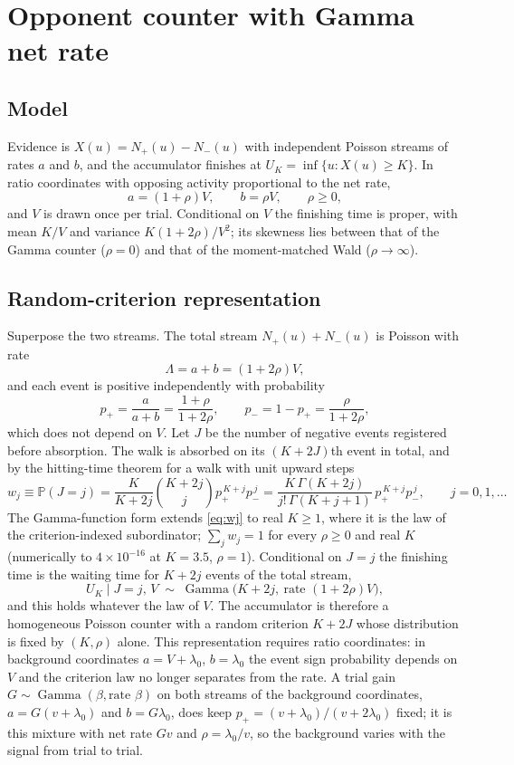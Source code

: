 \documentclass[11pt]{article}
\newcommand{\Gam}{\operatorname{Gamma}}
\newcommand{\Prob}{\mathbb{P}}
\begin{document}
\section{Opponent counter with Gamma net rate}

\subsection{Model}
Evidence is $X(u)=N_+(u)-N_-(u)$ with independent Poisson streams of rates $a$ and $b$, and the accumulator finishes at $U_K=\inf\{u: X(u)\ge K\}$. In ratio coordinates with opposing activity proportional to the net rate,
\[
a=(1+\rho)V,\qquad b=\rho V,\qquad \rho\ge0,
\]
and $V$ is drawn once per trial. Conditional on $V$ the finishing time is proper, with mean $K/V$ and variance $K(1+2\rho)/V^2$; its skewness lies between that of the Gamma counter ($\rho=0$) and that of the moment-matched Wald ($\rho\to\infty$).

\subsection{Random-criterion representation}
Superpose the two streams. The total stream $N_+(u)+N_-(u)$ is Poisson with rate
\[
\Lambda=a+b=(1+2\rho)V,
\]
and each event is positive independently with probability
\begin{equation}
p_+=\frac{a}{a+b}=\frac{1+\rho}{1+2\rho},\qquad p_-=1-p_+=\frac{\rho}{1+2\rho},
\label{eq:pplus}
\end{equation}
which does not depend on $V$. Let $J$ be the number of negative events registered before absorption. The walk is absorbed on its $(K+2J)$th event in total, and by the hitting-time theorem for a walk with unit upward steps
\begin{equation}
w_j\equiv\Prob(J=j)=\frac{K}{K+2j}\binom{K+2j}{j}p_+^{\,K+j}p_-^{\,j}
=\frac{K\,\Gamma(K+2j)}{j!\,\Gamma(K+j+1)}\,p_+^{\,K+j}p_-^{\,j},\qquad j=0,1,\dots
\label{eq:wj}
\end{equation}
The Gamma-function form extends \eqref{eq:wj} to real $K\ge1$, where it is the law of the criterion-indexed subordinator; $\sum_j w_j=1$ for every $\rho\ge0$ and real $K$ (numerically to $4\times10^{-16}$ at $K=3.5$, $\rho=1$). Conditional on $J=j$ the finishing time is the waiting time for $K+2j$ events of the total stream,
\[
U_K\mid J=j,\,V\;\sim\;\Gam\!\big(K+2j,\ \text{rate }(1+2\rho)V\big),
\]
and this holds whatever the law of $V$. The accumulator is therefore a homogeneous Poisson counter with a random criterion $K+2J$ whose distribution is fixed by $(K,\rho)$ alone. This representation requires ratio coordinates: in background coordinates $a=V+\lambda_0$, $b=\lambda_0$ the event sign probability depends on $V$ and the criterion law no longer separates from the rate. A trial gain $G\sim\Gam(\beta,\text{rate }\beta)$ on both streams of the background coordinates, $a=G(v+\lambda_0)$ and $b=G\lambda_0$, does keep $p_+=(v+\lambda_0)/(v+2\lambda_0)$ fixed; it is this mixture with net rate $Gv$ and $\rho=\lambda_0/v$, so the background varies with the signal from trial to trial.
\end{document}
